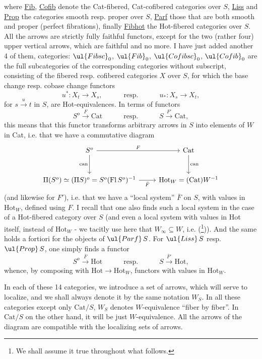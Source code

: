 where \underline{Fib}, \underline{Cofib} denote the Cat-fibered, Cat-cofibered categories over $S$, \underline{Liss} and \underline{Prop} the categories
smooth resp. proper over $S$, \underline{Parf} those that are both smooth and proper (perfect fibrations), finally \underline{Fibhot} the Hot-fibered categories over $S$. All the arrows are strictly fully faithful functors, except for the two (rather four) upper vertical arrows, which are faithful and no more. I have just added another 4 of them, categories: $\ul{Fibsc}_0$, $\ul{Fib}_0$, $\ul{Cofibsc}_0$, $\ul{Cofib}_0$ are the full subcategories of the corresponding categories without subscript, consisting of the fibered resp. cofibered categories $X$ over $S$, for which the base change resp. cobase change functors
\[
u^* : X_t \longrightarrow X_s, \qquad\quad \text{resp.} \qquad\quad u_* : X_s \longrightarrow X_t,
\]
for $s \xrightarrow{u} t$ in $S$, are Hot-equivalences. In terms of functors
\[
S^o \xrightarrow{F} \mathrm{Cat} \qquad\quad \text{resp.} \qquad\quad S \xrightarrow{F'} \mathrm{Cat},
\]
this means that this functor transforms arbitrary arrows in $S$ into elements of $W$ in Cat, i.e. that we have a commutative diagram
\[
\begin{tikzcd}[row sep=large]
S^o \arrow[r, "F"] \arrow[d, "\mathrm{can}"'] & \mathrm{Cat} \arrow[d, "\mathrm{can}"] \\
\Pi(S^o) \simeq (\Pi S)^o = S^o(\mathrm{Fl}\,S^o)^{-1} \arrow[r, "\bar F"'] & \mathrm{Hot}_W = (\mathrm{Cat})W^{-1}
\end{tikzcd}
\]
(and likewise for $F'$), i.e. that we have a ``local
system'' $\bar F$ on $S$, with values in $\mathrm{Hot}_W$, defined using $F$. I recall that one also finds such a local system in the case of a Hot-fibered category over $S$ (and even a local system with values in Hot itself, instead of $\mathrm{Hot}_W$ - we tacitly use here that $W_\infty \subseteq W$, i.e.  (\footnote[5]{We shall assume it true throughout what follows.})). And the same holds a fortiori for the objects of $\ul{Parf}\,S$. For $\ul{Liss}\,S$ resp. $\ul{Prop}\,S$, one simply finds a functor
\[
S^o \xrightarrow{\bar F} \mathrm{Hot} \qquad\quad \text{resp.} \qquad\quad S \xrightarrow{\bar F'} \mathrm{Hot},
\]
whence, by composing with $\mathrm{Hot} \longrightarrow \mathrm{Hot}_W$, functors with values in $\mathrm{Hot}_W$.

In each of these 14 categories, we introduce a set of arrows, which will serve to localize, and we shall always denote it by the same notation $W_S$. In all these categories except only $\mathrm{Cat}/S$, $W_S$ denotes $W$-equivalence ``fiber by fiber''. In $\mathrm{Cat}/S$ on the other hand, it will be just $W$-equivalence. All the arrows of the diagram are compatible with the localizing sets of arrows.

